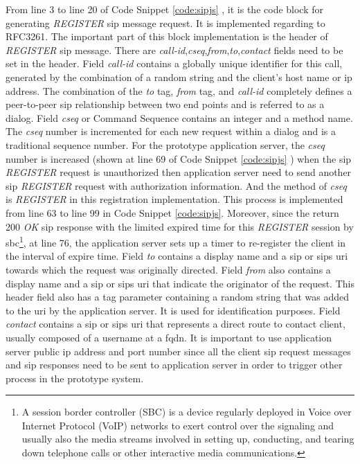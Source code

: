 \par From line 3 to line 20 of Code Snippet \ref{code:sipjs} , it is the code block for generating \textit{REGISTER} \gls{sip} message request. It is implemented regarding to RFC3261. The important part of this block implementation is the header of \textit{REGISTER} \gls{sip} message. There are \textit{call-id},\textit{cseq},\textit{from},\textit{to},\textit{contact} fields need to be set in the header. Field \textit{call-id} contains a globally unique identifier for this call, generated by the combination of a random string and the client's host name or \gls{ip} address. The combination of the \textit{to} tag, \textit{from} tag, and \textit{call-id} completely defines a peer-to-peer \gls{sip} relationship between two end points and is referred to as a dialog. Field \textit{cseq} or Command Sequence contains an integer and a method name. The \textit{cseq} number is incremented for each new request within a dialog and is a traditional sequence number. For the prototype application server, the \textit{cseq} number is increased (shown at line 69 of Code Snippet \ref{code:sipjs} ) when the \gls{sip} \textit{REGISTER} request is unauthorized then application server need to send another \gls{sip} \textit{REGISTER} request with authorization information. And the method of \textit{cseq} is \textit{REGISTER} in this registration implementation. This process is implemented from line 63 to line 99 in Code Snippet \ref{code:sipjs}. Moreover, since the return 200 \textit{OK} \gls{sip} response with the limited expired time for this \textit{REGISTER} session by \gls{sbc}\footnote{A session border controller (SBC) is a device regularly deployed in Voice over Internet Protocol (VoIP) networks to exert control over the signaling and usually also the media streams involved in setting up, conducting, and tearing down telephone calls or other interactive media communications.\cite{wiki:sbc}}, at line 76, the application server sets up a timer to re-register the client in the interval of expire time. Field \textit{to} contains a display name and a \gls{sip} or \gls{sip}s \gls{uri} towards which the request was originally directed. Field \textit{from} also contains a display name and a \gls{sip} or \gls{sip}s \gls{uri} that indicate the originator of the request. This header field also has a tag parameter containing a random string that was added to the \gls{uri} by the application server. It is used for identification purposes. Field \textit{contact} contains a \gls{sip} or \gls{sip}s \gls{uri} that represents a direct route to contact client, usually composed of a username at a \gls{fqdn}. It is important to use application server public \gls{ip} address and port number since all the client \gls{sip} request messages and \gls{sip} responses need to be sent to application server in order to trigger other process in the prototype system.

